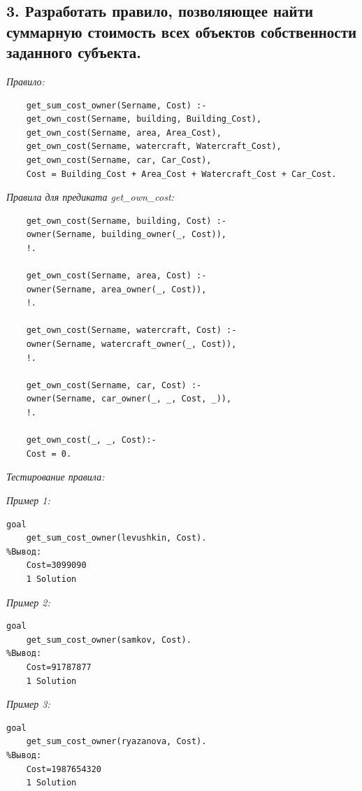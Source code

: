 \documentclass[a4paper,12pt]{article}
\begin{document}
	\subsection*{3. Разработать правило, позволяющее найти суммарную стоимость всех объектов собственности заданного субъекта.}
	
	\textit{Правило:}
	
	\begin{verbatim}
	get_sum_cost_owner(Sername, Cost) :-
	get_own_cost(Sername, building, Building_Cost),
	get_own_cost(Sername, area, Area_Cost),
	get_own_cost(Sername, watercraft, Watercraft_Cost),
	get_own_cost(Sername, car, Car_Cost),
	Cost = Building_Cost + Area_Cost + Watercraft_Cost + Car_Cost.
	\end{verbatim}
	
	\textit{Правила для предиката get\_own\_cost:}
	
	\begin{verbatim}
	get_own_cost(Sername, building, Cost) :-
	owner(Sername, building_owner(_, Cost)),
	!.
	
	get_own_cost(Sername, area, Cost) :-
	owner(Sername, area_owner(_, Cost)),
	!.
	
	get_own_cost(Sername, watercraft, Cost) :-
	owner(Sername, watercraft_owner(_, Cost)),
	!.
	
	get_own_cost(Sername, car, Cost) :-
	owner(Sername, car_owner(_, _, Cost, _)),
	!.
	
	get_own_cost(_, _, Cost):-
	Cost = 0.
	\end{verbatim}
	
	\textit{Тестирование правила:}
	
	\textit{Пример 1:}
	
	\begin{verbatim}
goal
	get_sum_cost_owner(levushkin, Cost).
%Вывод:
	Cost=3099090
	1 Solution
	\end{verbatim}
	
	\textit{Пример 2:}
	
	\begin{verbatim}
goal
	get_sum_cost_owner(samkov, Cost).
%Вывод:
	Cost=91787877
	1 Solution
	\end{verbatim}
	
	\textit{Пример 3:}
	
		\begin{verbatim}
goal
	get_sum_cost_owner(ryazanova, Cost).
%Вывод:
	Cost=1987654320
	1 Solution
	\end{verbatim}
	
\end{document}
